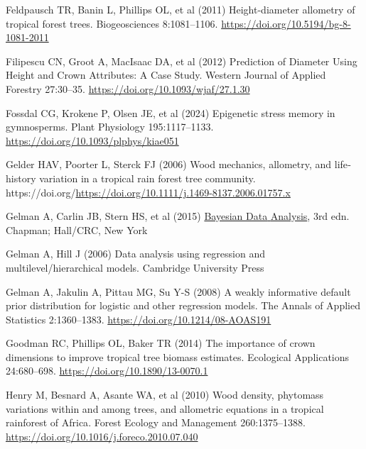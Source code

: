 \documentclass[
  12pt,
  letterpaper,
  DIV=11,
  numbers=noendperiod]{scrartcl}
\newlength{\cslhangindent}
\newlength{\cslentryspacingunit} %
\newenvironment{CSLReferences}[2] %
 {%
  \setlength{\parindent}{0pt}
  \ifodd #1
  \let\oldpar\par
  \def\par{\hangindent=\cslhangindent\oldpar}
  \fi
  \setlength{\parskip}{#2\cslentryspacingunit}
 }%
 {}
\begin{document}
\begin{CSLReferences}{1}{0}
\leavevmode{}%
Feldpausch TR, Banin L, Phillips OL, et al (2011) Height-diameter
allometry of tropical forest trees. Biogeosciences 8:1081--1106.
\url{https://doi.org/10.5194/bg-8-1081-2011}

\leavevmode{}%
Filipescu CN, Groot A, MacIsaac DA, et al (2012) Prediction of
{Diameter} {Using} {Height} and {Crown} {Attributes}: {A} {Case}
{Study}. Western Journal of Applied Forestry 27:30--35.
\url{https://doi.org/10.1093/wjaf/27.1.30}

\leavevmode{}%
Fossdal CG, Krokene P, Olsen JE, et al (2024) Epigenetic stress memory
in gymnosperms. Plant Physiology 195:1117--1133.
\url{https://doi.org/10.1093/plphys/kiae051}

\leavevmode{}%
Gelder HAV, Poorter L, Sterck FJ (2006) Wood mechanics, allometry, and
life‐history variation in a tropical rain forest tree community.
https://doi.org/\url{https://doi.org/10.1111/j.1469-8137.2006.01757.x}

\leavevmode{}%
Gelman A, Carlin JB, Stern HS, et al (2015)
\href{https://doi.org/10.1201/b16018}{Bayesian {Data} {Analysis}}, 3rd
edn. Chapman; Hall/CRC, New York

\leavevmode{}%
Gelman A, Hill J (2006) Data analysis using regression and
multilevel/hierarchical models. Cambridge University Press

\leavevmode{}%
Gelman A, Jakulin A, Pittau MG, Su Y-S (2008) A weakly informative
default prior distribution for logistic and other regression models. The
Annals of Applied Statistics 2:1360--1383.
\url{https://doi.org/10.1214/08-AOAS191}

\leavevmode{}%
Goodman RC, Phillips OL, Baker TR (2014) The importance of crown
dimensions to improve tropical tree biomass estimates. Ecological
Applications 24:680--698. \url{https://doi.org/10.1890/13-0070.1}

\leavevmode{}%
Henry M, Besnard A, Asante WA, et al (2010) Wood density, phytomass
variations within and among trees, and allometric equations in a
tropical rainforest of {Africa}. Forest Ecology and Management
260:1375--1388. \url{https://doi.org/10.1016/j.foreco.2010.07.040}


\end{CSLReferences}
\end{document}

